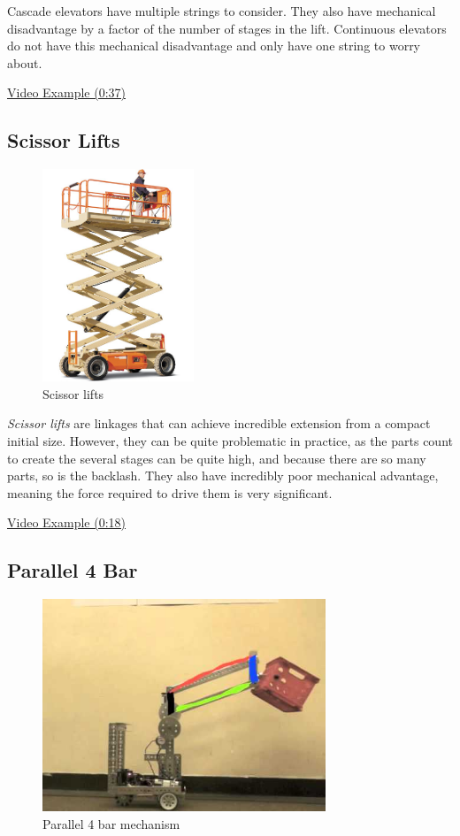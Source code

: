 Cascade elevators have multiple strings to consider. They also have mechanical disadvantage by a factor of the number of stages in the lift. Continuous elevators do not have this mechanical disadvantage and only have one string to worry about.

\href{https://youtu.be/HJVGgaAJefo?t=37}{\color{red}\underline{Video Example (0:37)}}
\subsection{Scissor Lifts}
\begin{figure}[H]
	\includegraphics[height=2.5in]{imgs/scissorlift.jpeg}
	\caption{Scissor lifts}
\end{figure}

\textit{Scissor lifts} are linkages that can achieve incredible extension from a compact initial size. However, they can be quite problematic in practice, as the parts count to create the several stages can be quite high, and because there are so many parts, so is the backlash. They also have incredibly poor mechanical advantage, meaning the force required to drive them is very significant.

\href{https://youtu.be/J_VfCjKBGNw?t=18}{\color{red}\underline{Video Example (0:18)}}
\subsection{Parallel 4 Bar}
\begin{figure}[H]
	\includegraphics[height=2.5in]{imgs/parallel_4bar.jpeg}
	\caption{Parallel 4 bar mechanism}
\end{figure}

